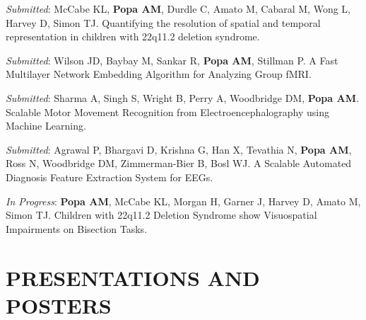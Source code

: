 \documentclass[line,margin,10pt]{res}
\begin{document}
\begin{resume}
{\sl Submitted}: McCabe KL, \textbf{Popa AM}, Durdle C, Amato M, Cabaral M, Wong L, Harvey D, Simon TJ. Quantifying the resolution of spatial and temporal representation in children with 22q11.2 deletion syndrome.

{\sl Submitted}: Wilson JD, Baybay M, Sankar R, \textbf{Popa AM}, Stillman P. A Fast Multilayer Network Embedding Algorithm for Analyzing Group fMRI.

{\sl Submitted}: Sharma A, Singh S, Wright B, Perry A, Woodbridge DM, \textbf{Popa AM}. Scalable Motor Movement Recognition from Electroencephalography using Machine Learning. 

{\sl Submitted}: Agrawal P, Bhargavi D, Krishna G, Han X, Tevathia N, \textbf{Popa AM}, Ross N, Woodbridge DM, Zimmerman-Bier B, Bosl WJ. A Scalable Automated Diagnosis Feature Extraction System for EEGs. 

{\sl In Progress}: \textbf{Popa AM}, McCabe KL, Morgan H, Garner J, Harvey D, Amato M,  Simon TJ. Children with 22q11.2 Deletion Syndrome show Visuospatial Impairments on Bisection Tasks.

\section{PRESENTATIONS AND POSTERS} 


\end{resume}
\end{document}
